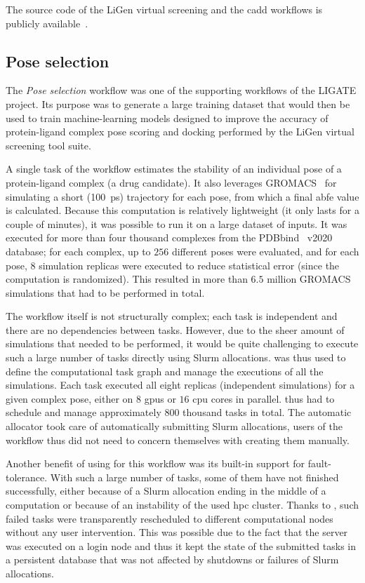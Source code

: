 The source code of the LiGen virtual screening and the \gls{cadd} workflows is
publicly available~\cite{cadd-workflow}.

\subsection{Pose selection}
The \emph{Pose selection} workflow was one of the supporting workflows of the LIGATE project. Its
purpose was to generate a large training dataset that would then be used to train machine-learning
models designed to improve the accuracy of protein-ligand complex pose scoring and docking
performed by the LiGen virtual screening tool suite.

A single task of the workflow estimates the stability of an individual pose of a protein-ligand
complex (a drug candidate). It also leverages GROMACS~\cite{gromacs} for simulating a
short (\SI{100}{\pico\second}) trajectory for each pose, from which a final
\gls{abfe} value is calculated. Because this computation is relatively lightweight (it
only lasts for a couple of minutes), it was possible to run it on a large dataset of inputs. It was
executed for more than four thousand complexes from the PDBbind~\cite{pdbbind} v2020
database; for each complex, up to $256$ different poses were evaluated, and for
each pose, $8$ simulation replicas were executed to reduce statistical error
(since the computation is randomized). This resulted in more than $6.5$ million
GROMACS simulations that had to be performed in total.

The workflow itself is not structurally complex; each task is independent and there are no
dependencies between tasks. However, due to the sheer amount of simulations that needed to be
performed, it would be quite challenging to execute such a large number of tasks directly using
Slurm allocations. \hyperqueue{} was thus used to define the computational task graph and
manage the executions of all the simulations. Each task executed all eight replicas (independent
simulations) for a given complex pose, either on $8$ \glspl{gpu} or
$16$ \gls{cpu} cores in parallel. \hyperqueue{} thus had
to schedule and manage approximately $800$ thousand tasks in total. The automatic
allocator took care of automatically submitting Slurm allocations, users of the workflow thus did
not need to concern themselves with creating them manually.

Another benefit of using \hyperqueue{} for this workflow was its built-in support for
fault-tolerance. With such a large number of tasks, some of them have not finished successfully,
either because of a Slurm allocation ending in the middle of a computation or because of an
instability of the used \gls{hpc} cluster. Thanks to \hyperqueue{}, such
failed tasks were transparently rescheduled to different computational nodes without any user
intervention. This was possible due to the fact that the \hq{} server was
executed on a login node and thus it kept the state of the submitted tasks in a persistent database
that was not affected by shutdowns or failures of Slurm allocations.

